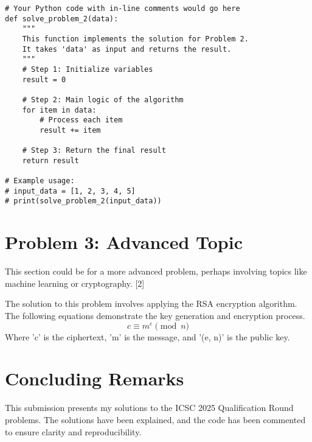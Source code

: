 \documentclass{solutionclass} %
\begin{document}
    \begin{solution}
\begin{lstlisting}[style=pythonstyle]
# Your Python code with in-line comments would go here
def solve_problem_2(data):
    """
    This function implements the solution for Problem 2.
    It takes 'data' as input and returns the result.
    """
    # Step 1: Initialize variables
    result = 0

    # Step 2: Main logic of the algorithm
    for item in data:
        # Process each item
        result += item

    # Step 3: Return the final result
    return result

# Example usage:
# input_data = [1, 2, 3, 4, 5]
# print(solve_problem_2(input_data))
\end{lstlisting}
    \end{solution}

    \section{Problem 3: Advanced Topic}
    This section could be for a more advanced problem, perhaps involving topics like machine learning or cryptography. [2]

    \begin{solution}
        The solution to this problem involves applying the RSA encryption algorithm. The following equations demonstrate the key generation and encryption process.
        \begin{equation}\label{eq: 1}
            c \equiv m^e \pmod{n}
        \end{equation}
        Where 'c' is the ciphertext, 'm' is the message, and '(e, n)' is the public key.
    \end{solution}

    \divider

    \section{Concluding Remarks}
    This submission presents my solutions to the ICSC 2025 Qualification Round problems. The solutions have been explained, and the code has been commented to ensure clarity and reproducibility.

    \thispagestyle{fancyplain}
    \fancyhead{}
    \renewcommand{\headrulewidth}{0pt}
\end{document}
